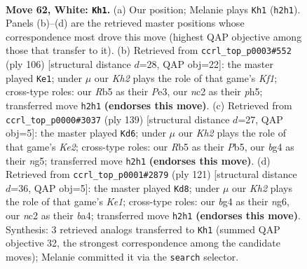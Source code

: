\documentclass[11pt]{article}
\begin{document}
\clearpage

\begin{figure}[p]\centering
\begin{subfigure}{0.46\textwidth}\centering
\resizebox{\linewidth}{!}{%
\newchessgame
\chessboard[
  setfen={8/5k2/2r5/1R6/r5bB/6R1/2n2P1K/8 w - - 3 62},
  showmover=false,
  pgfstyle=straightmove, color=movearrow, markmove={h2-h1}
]}
\caption{}
\end{subfigure}\hfill
\begin{subfigure}{0.46\textwidth}\centering
\resizebox{\linewidth}{!}{%
\newchessgame
\chessboard[
  setfen={8/8/2Rb4/5k1p/B7/1P2P3/3r4/5K2 w - - 0 54},
  showmover=false,
  pgfstyle=straightmove, color=movearrow, markmove={f1-e1}
]}
\caption{}
\end{subfigure}
\\[4pt]
\begin{subfigure}{0.46\textwidth}\centering
\resizebox{\linewidth}{!}{%
\newchessgame
\chessboard[
  setfen={5r2/3bk1p1/8/1p4N1/8/P1RB2K1/8/8 b - - 0 70},
  showmover=false,
  pgfstyle=straightmove, color=movearrow, markmove={e7-d6}
]}
\caption{}
\end{subfigure}\hfill
\begin{subfigure}{0.46\textwidth}\centering
\resizebox{\linewidth}{!}{%
\newchessgame
\chessboard[
  setfen={4k3/2r5/1b4N1/8/B5P1/2Bp4/6K1/8 b - - 2 61},
  showmover=false,
  pgfstyle=straightmove, color=movearrow, markmove={e8-d8}
]}
\caption{}
\end{subfigure}
\caption{\textbf{Move 62, White: \texttt{Kh1}.} (a) Our position; Melanie plays \texttt{Kh1} (\texttt{h2h1}). Panels (b)--(d) are the retrieved master positions whose correspondence most drove this move (highest QAP objective among those that transfer to it). (b) Retrieved from \texttt{ccrl\_top\_p0003\#552} (ply 106) [structural distance $d$=28, QAP obj=22]: the master played \texttt{Ke1}; under $\mu$ our \emph{Kh2} plays the role of that game's \emph{Kf1}; cross-type roles: our \emph{R}b5 as their \emph{P}e3, our \emph{n}c2 as their \emph{p}h5; transferred move \texttt{h2h1} \textbf{(endorses this move)}. (c) Retrieved from \texttt{ccrl\_top\_p0000\#3037} (ply 139) [structural distance $d$=27, QAP obj=5]: the master played \texttt{Kd6}; under $\mu$ our \emph{Kh2} plays the role of that game's \emph{Ke2}; cross-type roles: our \emph{R}b5 as their \emph{P}b5, our \emph{b}g4 as their \emph{n}g5; transferred move \texttt{h2h1} \textbf{(endorses this move)}. (d) Retrieved from \texttt{ccrl\_top\_p0001\#2879} (ply 121) [structural distance $d$=36, QAP obj=5]: the master played \texttt{Kd8}; under $\mu$ our \emph{Kh2} plays the role of that game's \emph{Ke1}; cross-type roles: our \emph{b}g4 as their \emph{n}g6, our \emph{n}c2 as their \emph{b}a4; transferred move \texttt{h2h1} \textbf{(endorses this move)}. Synthesis: 3 retrieved analogs transferred to \texttt{Kh1} (summed QAP objective 32, the strongest correspondence among the candidate moves); Melanie committed it via the \texttt{search} selector.}
\label{fig:thought-m122}
\end{figure}
\end{document}
